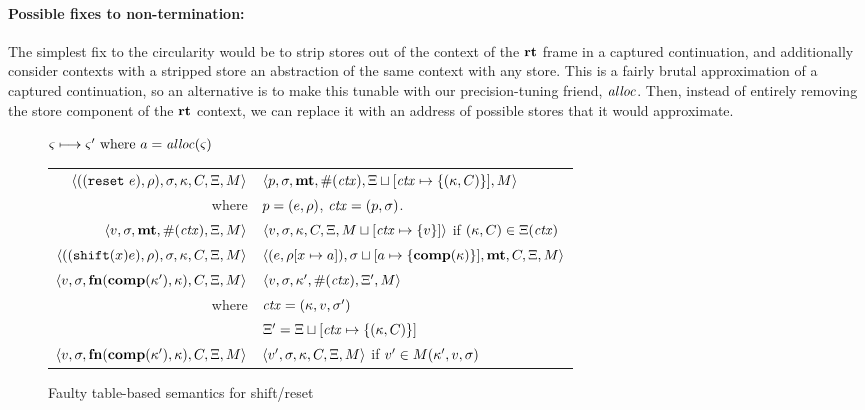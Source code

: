 \documentclass{llncs}
\begin{document}
\paragraph{Possible fixes to non-termination:} The simplest fix to the
circularity would be to strip stores out of the context of the $\mathbf{rt}$
frame in a captured continuation, and additionally consider contexts
with a stripped store an abstraction of the same context with any
store. This is a fairly brutal approximation of a captured
continuation, so an alternative is to make this tunable with our
precision-tuning friend, $\mathit{alloc}$. Then, instead of entirely removing
the store component of the $\mathbf{rt}$ context, we can replace it with an
address of possible stores that it would approximate.

\begin{figure}
  \centering
  $\varsigma \longmapsto \varsigma' \text{ where } a = \mathit{alloc}(\varsigma)$ \\
  \begin{tabular}{r|l}
    \hline
    $\langle ((\texttt{reset}\ e), \rho), \sigma, \kappa, C, \Xi, M \rangle$
    &
    $\langle p, \sigma, \mathbf{mt}, \#(\mathit{ctx}), \Xi\sqcup[\mathit{ctx} \mapsto \{ (\kappa,C) \}], M \rangle$
    \\
    where & $p = (e, \rho)$, $\mathit{ctx} = (p, \sigma)$.
    \\
    $\langle v, \sigma, \mathbf{mt}, \#(\mathit{ctx}), \Xi, M \rangle$
    &
    $\langle v, \sigma, {\kappa}, {C}, \Xi, M\sqcup[\mathit{ctx} \mapsto \{ v \}] \rangle$
    if $(\kappa,C) \in \Xi(\mathit{ctx})$
    \\
    $\langle ((\texttt{shift} (x) e), \rho), \sigma, \kappa, C, \Xi, M \rangle$
    &
    $\langle (e, \rho[x \mapsto a]), \sigma\sqcup[a \mapsto \{ \mathbf{comp}(\kappa) \}],\mathbf{mt},C,\Xi,M \rangle$
    \\
    $\langle v,\sigma,\mathbf{fn}{}(\mathbf{comp}(\kappa'), \kappa), C, \Xi, M \rangle$
    &
    $\langle v, \sigma, \kappa', \#(\mathit{ctx}), \Xi',M \rangle$
    \\
    where & $\mathit{ctx} = (\kappa, v, \sigma')$ \\
          & $\Xi' = \Xi\sqcup[\mathit{ctx} \mapsto \{ (\kappa,C) \}]$
    \\
    $\langle v,\sigma,\mathbf{fn}{}(\mathbf{comp}(\kappa'), \kappa), C, \Xi, M \rangle$
    &
    $\langle v', \sigma, \kappa, C, \Xi,M \rangle$ if $v' \in M(\kappa',v,\sigma)$
  \end{tabular}  
  \caption{Faulty table-based semantics for shift/reset}
  \label{fig:shift-reset-table0}
\end{figure}
\end{document}
